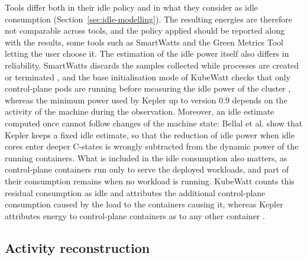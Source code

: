 \documentclass[
  acmsmall,
  screen,
  review,
  xcolor={dvipsnames,usenames}
]{acmart}
\begin{document}
Tools differ both in their idle policy and in what they consider as idle consumption (Section~\ref{sec:idle-modelling}). The resulting energies are therefore not comparable across tools, and the policy applied should be reported along with the results, some tools such as SmartWatts and the Green Metrics Tool letting the user choose it. The estimation of the idle power itself also differs in reliability. SmartWatts discards the samples collected while processes are created or terminated \cite{fieniSmartWattsSelfCalibratingSoftwareDefined2020}, and the base initialisation mode of KubeWatt checks that only control-plane pods are running before measuring the idle power of the cluster \cite{pijnackerContainerlevelEnergyObservability2025}, whereas the minimum power used by Kepler up to version 0.9 depends on the activity of the machine during the observation. Moreover, an idle estimate computed once cannot follow changes of the machine state: Bellal et al. \cite{bellalInvestigatingPotentialKepler} show that Kepler keeps a fixed idle estimate, so that the reduction of idle power when idle cores enter deeper C-states is wrongly subtracted from the dynamic power of the running containers. What is included in the idle consumption also matters, as control-plane containers run only to serve the deployed workloads, and part of their consumption remains when no workload is running. KubeWatt counts this residual consumption as idle and attributes the additional control-plane consumption caused by the load to the containers causing it, whereas Kepler attributes energy to control-plane containers as to any other container \cite{pijnackerContainerlevelEnergyObservability2025}.

\subsection{Activity reconstruction}
\end{document}
